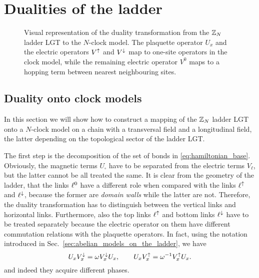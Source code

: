 \section{Dualities of the ladder}%
\label{sec:dualities_of_the_ladder}




\begin{figure}[t]
    \centering
    
    \caption{Visual representation of the duality transformation from the $\mathbb{Z}_N$ ladder LGT to the $N$-clock model.
    The plaquette operator $U_x$ and the electric operators $V^{\uparrow}$ and $V^{\downarrow}$ map to one-site operators in the clock model, while
    the remaining electric operator $V^0$ maps to a hopping term between nearest neighbouring sites.}
    \label{fig:ladder_duality}
\end{figure}

\subsection{Duality onto clock models}
\label{sub:duality_onto_clock_models}

In this section we will show how to construct a mapping of the $\mathbb{Z}_N$ ladder LGT onto a $N$-clock model on a chain with a transversal field and a longitudinal field, the latter depending on the topological sector of the ladder LGT.

The first step is the decomposition of the set of bonds in \eqref{eq:hamiltonian_base}.
Obviously, the magnetic terms $U_{\square}$ have to be separated from the electric terms $V_\ell$, but the latter cannot be all treated the same.
It is clear from the geometry of the ladder, that the links $\ell^0$ have a different role when compared with the links $\ell^\uparrow$ and $\ell^\downarrow$, because the former are \emph{domain walls} while the latter are not.
Therefore, the duality transformation has to distinguish between the vertical links and horizontal links.
Furthermore, also the top links $\ell^\uparrow$ and bottom links $\ell^\downarrow$ have to be treated separately because the electric operator on them have different commutation relations with the plaquette operators.
In fact, using the notation introduced in Sec.~\ref{sec:abelian_models_on_the_ladder}, we have
\begin{equation}
    U_x V^{\downarrow}_x = \omega V^{\downarrow}_x U_x, \qquad
    U_x V^{\uparrow}_x = \omega^{-1} V^{\uparrow}_x U_x.
    \label{eq:comm_rel_ladder}
\end{equation}
and indeed they acquire different phases.

